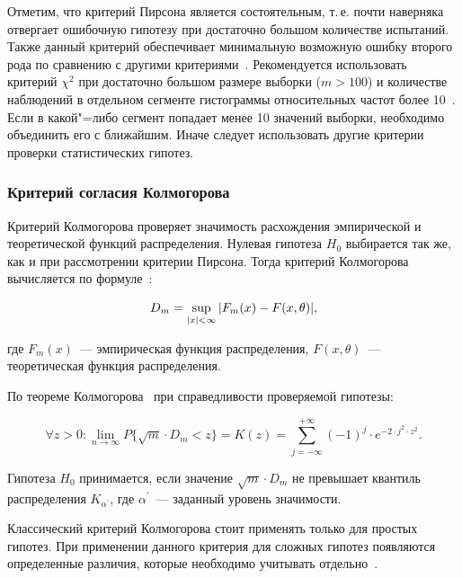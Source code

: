 \documentclass[a4paper, article, 12pt]{extarticle}
\begin{document}
Отметим, что критерий Пирсона является состоятельным, т.\,е. почти наверняка отвергает ошибочную гипотезу при достаточно большом количестве испытаний. Также данный критерий обеспечивает минимальную возможную ошибку второго рода по сравнению с другими критериями~\cite{petrushyn_ulyanov_definitions}. Рекомендуется использовать критерий $\chi^2$ при достаточно большом размере выборки ($m > 100$) и количестве наблюдений в отдельном сегменте гистограммы относительных частот более 10~\cite{koroluk}. Если в какой"=либо сегмент попадает менее 10 значений выборки, необходимо объединить его с ближайшим. Иначе следует использовать другие критерии проверки статистических гипотез.

\subsubsection{Критерий согласия Колмогорова}\label{sec:kolmogorov_criteria}

Критерий Колмогорова проверяет значимость расхождения эмпирической и теоретической функций распределения. Нулевая гипотеза $H_0$ выбирается так же, как и при рассмотрении критерии Пирсона. Тогда критерий Колмогорова вычисляется по формуле~\cite{koroluk}:

\begin{equation}\label{eq:kolmogorov_criteria}
	D_m = \sup_{\abs*{x} < \infty}{\abs*{F_m(x) - F(x, \theta)}},
\end{equation}

\noindent где $F_m(x)$~--- эмпирическая функция распределения, $F(x, \theta)$~--- теоретическая функция распределения.

По теореме Колмогорова~\cite{koroluk} при справедливости проверяемой гипотезы:

\begin{equation}\label{eq:kolmogorov_test}
	\forall z > 0: \lim_{n \rightarrow \infty}{P\{\sqrt{m} \cdot D_m < z\}} = K(z) = \sum_{j = -\infty}^{+\infty}{(-1)^j \cdot e^{-2 \cdot j^2 \cdot z^2}}.
\end{equation}

\noindent Гипотеза $H_0$ принимается, если значение $\sqrt{m} \cdot D_m$ не превышает квантиль распределения $K_{\alpha^{'}}$, где $\alpha^{'}$~--- заданный уровень значимости.

Классический критерий Колмогорова стоит применять только для простых гипотез. При применении данного критерия для сложных гипотез появляются определенные различия, которые необходимо учитывать отдельно~\cite{kac}.
\end{document}
